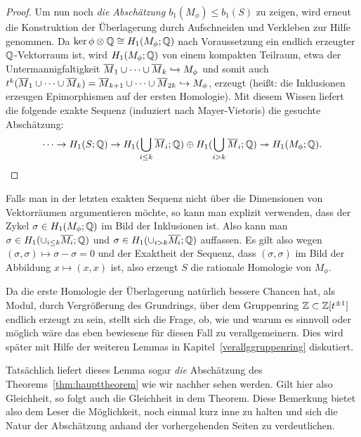 \begin{proof}
	  Um nun noch\emph{ die Abschätzung $b_1(M_\phi) \leq b_1(S)$ }zu zeigen, wird erneut die Konstruktion der Überlagerung durch Aufschneiden und Verkleben zur Hilfe genommen. Da $\ker\phi \otimes \mathbb{Q} \cong H_1(M_\phi;\mathbb{Q})$ nach Voraussetzung ein endlich erzeugter $\mathbb{Q}$-Vektorraum ist, wird $H_1(M_\phi;\mathbb{Q})$ von einem kompakten Teilraum, etwa der Untermannigfaltigkeit $\overline M_1 \cup \cdots \cup \overline M_k \hookrightarrow M_\phi$ und somit auch $t^k(\overline M_1 \cup \cdots \cup \overline M_k )  = \overline M_{k+1} \cup \cdots \cup \overline M_{2k}\hookrightarrow M_\phi$, erzeugt (heißt: die Inklusionen erzeugen Epimorphismen auf der ersten Homologie). Mit diesem Wissen liefert die folgende exakte Sequenz (induziert nach Mayer-Vietoris) die gesuchte Abschätzung:
	  \[
	  	\cdots \to H_1(S;\mathbb{Q}) \to H_1(\bigcup_{i\leq k}\overline M_i;\mathbb{Q}) \oplus H_1(\bigcup_{i>k} \overline M_i;\mathbb{Q}) \twoheadrightarrow H_1(M_\phi;\mathbb{Q}).
	  \]
\end{proof}
\begin{bem}
	Falls man in der letzten exakten Sequenz nicht über die Dimensionen von Vektorräumen argumentieren möchte, so kann man explizit verwenden, dass der Zykel $\sigma \in H_1(M_\phi;\mathbb{Q})$ im Bild der Inklusionen ist. Also kann man $\sigma \in H_1(\cup_{i\leq k} \overline{M_i};\mathbb{Q})$ und $\sigma \in H_1(\cup_{i > k} \overline{M_i};\mathbb{Q})$ auffassen. Es gilt also wegen $(\sigma,\sigma) \mapsto \sigma-\sigma=0$  und der Exaktheit der Sequenz, dass $(\sigma,\sigma)$ im Bild der Abbildung $x \mapsto (x,x)$ ist, also erzeugt $S$ die rationale Homologie von $M_\phi$.
\end{bem}
\begin{bem}
Da die erste Homologie der Überlagerung natürlich bessere Chancen hat, als Modul, durch Vergrößerung des Grundrings, über dem Gruppenring $\mathbb{Z}\subset \mathbb{Z}[t^{\pm 1}]$ endlich erzeugt zu sein, stellt sich die Frage, ob, wie und warum es sinnvoll oder möglich wäre das eben bewiesene für diesen Fall zu verallgemeinern. Dies wird später mit Hilfe der weiteren Lemmas in Kapitel~\ref{verallggruppenring} diskutiert. 
\end{bem}
\begin{bem}
	Tatsächlich liefert dieses Lemma sogar \emph{die} Abschätzung des Theorems~\ref{thm:haupttheorem} wie wir nachher sehen werden. Gilt hier also Gleichheit, so folgt auch die Gleichheit in dem Theorem. Diese Bemerkung bietet also dem Leser die Möglichkeit, noch einmal kurz inne zu halten und sich die Natur der Abschätzung anhand der vorhergehenden Seiten zu verdeutlichen.
\end{bem}
